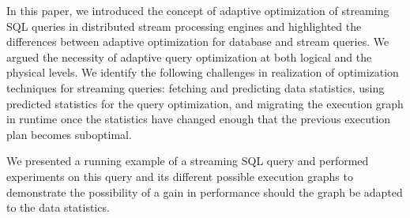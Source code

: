 \label {sec:fs-optimization-conclusion}
In this paper, we introduced  the concept  of adaptive optimization of streaming SQL queries in distributed stream processing engines and highlighted the differences between adaptive optimization 	for database and stream queries. 
We argued the necessity of adaptive query optimization at both  logical and the physical levels.
We identify the following challenges in realization of  optimization techniques for streaming queries: 
fetching and predicting data statistics, 
using predicted statistics for the query optimization, and migrating the execution graph in runtime once the statistics have changed enough that the previous execution plan becomes suboptimal. 

We presented a running example of a streaming SQL query and performed experiments on this query and its different possible execution graphs to demonstrate the possibility of a gain in performance should the graph be adapted to the data statistics. 